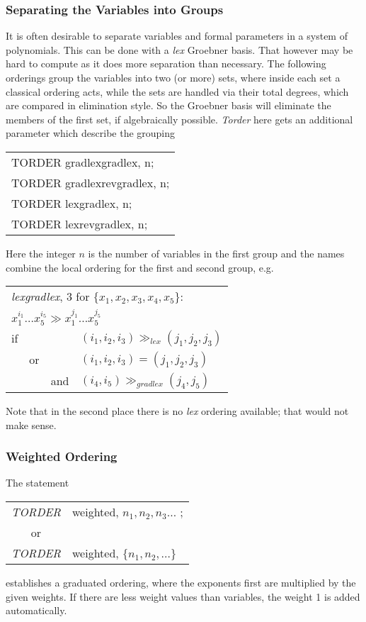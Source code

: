 \subsubsection{Separating the Variables into Groups }
It is often desirable to separate variables
and formal parameters in a system of polynomials. 
This can be done with a {\it lex} Groebner
basis.  That however may be hard to compute as it does more
separation than necessary. The following orderings group the
variables into two (or more) sets, where inside each set a classical
ordering acts, while the sets are handled via their total degrees,
which are compared in elimination style. So the Groebner basis will
eliminate the members of the first set, if algebraically possible. {\it
Torder} here gets an additional parameter which describe the
grouping
\begin{center}{\it
\begin{tabular}{l}
TORDER gradlexgradlex, n; \\
TORDER gradlexrevgradlex, n; \\
TORDER lexgradlex, n; \\
TORDER lexrevgradlex, n;
\end{tabular}}
\end{center}
Here the integer $n$ is the number of variables in the first group
and the names combine the local ordering for the first and second
group, e.g.
\begin{center}
\begin{tabular}{llll}
\multicolumn{4}{l}{{\it lexgradlex}, 3 for $\{x_1,x_2,x_3,x_4,x_5\}$:} \\
\multicolumn{4}{l}{$x_1^{i_1}\ldots x_5^{i_5} \gg x_1^{j_1}\ldots
x_5^{j_5}$} \\
if & & & $(i_1,i_2,i_3) \gg_{lex}(j_1,j_2,j_3)$ \\
& or & & $(i_1,i_2,i_3) = (j_1,j_2,j_3)$ \\
& & and & $(i_4,i_5) \gg_{gradlex}(j_4,j_5)$
\end{tabular}
\end{center}
Note that in the second place there is no {\it lex} ordering available;
that would not make sense.

\subsubsection{Weighted Ordering}
The statement
\begin{center}
\begin{tabular}{cl}
{\it TORDER} & weighted, $n_1,n_2,n_3 \ldots$ ; \\
or \\
{\it TORDER} & weighted, $\{n_1,n_2,\ldots\}$
\end{tabular}
\end{center}
establishes a graduated ordering, where the exponents first are
multiplied by the given weights. If there are less weight values than
variables, the weight 1 is added automatically.

